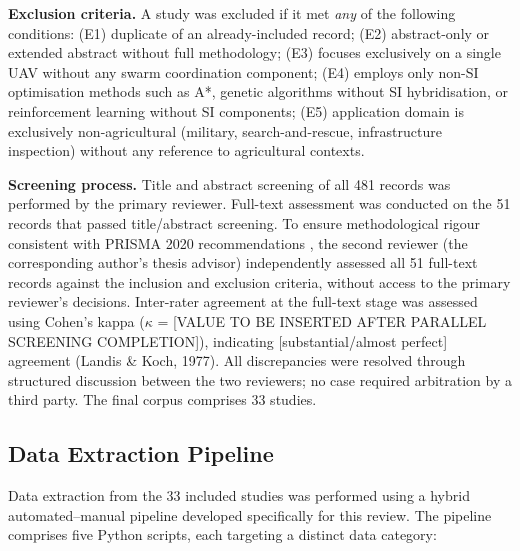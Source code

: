 \documentclass[review,3p,times]{elsarticle}
\begin{document}
\textbf{Exclusion criteria.} A study was excluded if it met \textit{any} of the following conditions: (E1) duplicate of an already-included record; (E2) abstract-only or extended abstract without full methodology; (E3) focuses exclusively on a single UAV without any swarm coordination component; (E4) employs only non-SI optimisation methods such as A*, genetic algorithms without SI hybridisation, or reinforcement learning without SI components; (E5) application domain is exclusively non-agricultural (military, search-and-rescue, infrastructure inspection) without any reference to agricultural contexts.

\textbf{Screening process.} Title and abstract screening of all 481 records was performed by the primary reviewer. Full-text assessment was conducted on the 51 records that passed title/abstract screening. To ensure methodological rigour consistent with PRISMA 2020 recommendations \cite{page2021}, the second reviewer (the corresponding author's thesis advisor) independently assessed all 51 full-text records against the inclusion and exclusion criteria, without access to the primary reviewer's decisions. Inter-rater agreement at the full-text stage was assessed using Cohen's kappa ($\kappa$ = [VALUE TO BE INSERTED AFTER PARALLEL SCREENING COMPLETION]), indicating [substantial/almost perfect] agreement (Landis \& Koch, 1977). All discrepancies were resolved through structured discussion between the two reviewers; no case required arbitration by a third party. The final corpus comprises 33 studies.

\subsection{Data Extraction Pipeline}

Data extraction from the 33 included studies was performed using a hybrid automated--manual pipeline developed specifically for this review. The pipeline comprises five Python scripts, each targeting a distinct data category:
\end{document}
